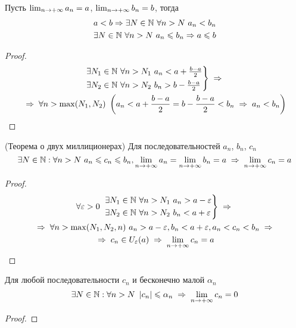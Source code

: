 \begin{theorem}
    Пусть $\lim_{n\to+\infty} a_n = a$, $\lim_{n\to+\infty} b_n = b$, тогда
    \begin{gather*}
        a < b \Rightarrow \exists N \in \mathbb{N}\ \forall n > N\ a_n < b_n \\
        \exists N \in \mathbb{N}\ \forall n > N\ a_n \leqslant b_n \Rightarrow a \leqslant b
    \end{gather*}
\end{theorem}
\begin{proof}
    \begin{multline*}
        \begin{rcases}
            \exists N_1 \in \N\ \forall n > N_1\ a_n < a + \frac{b - a}{2} \\
            \exists N_2 \in \N\ \forall n > N_2\ b_n > b - \frac{b - a}{2}
        \end{rcases} \thus \\
        \thus \forall n > \max(N_1, N_2)\ \left(a_n < a + \frac{b - a}{2} = b - \frac{b - a}{2} < b_n \thus
                a_n < b_n\right)
    \end{multline*}
\end{proof}

\begin{theorem}
    (Теорема о двух миллиционерах) Для последовательностей $a_n$, $b_n$, $c_n$
    \[ \exists N \in \N: \forall n > N\ a_n \le c_n \le b_n, \limpinf a_n = \limpinf b_n = a \thus \limpinf c_n = a \]
\end{theorem}
\begin{proof}
    \begin{multline*}
        \forall \varepsilon > 0\ 
        \begin{rcases}
            \exists N_1 \in \N\ \forall n > N_1\ a_n > a - \varepsilon \\
            \exists N_2 \in \N\ \forall n > N_2\ b_n < a + \varepsilon
        \end{rcases} \thus \\
        \thus \forall n > \max(N_1, N_2, n)\ a_n > a - \varepsilon, b_n < a + \varepsilon, a_n < c_n < b_n \thus \\
        \thus c_n \in U_\varepsilon(a) \thus
        \limpinf c_n = a
    \end{multline*}
\end{proof}

\begin{theorem}
    Для любой последовательности $c_n$ и бесконечно малой $\alpha_n$ 
    \[ \exists N \in \N: \forall n > N\ \abs{c_n} \le \alpha_n \thus \limpinf c_n = 0 \]
\end{theorem}
\begin{proof}
\end{proof}

